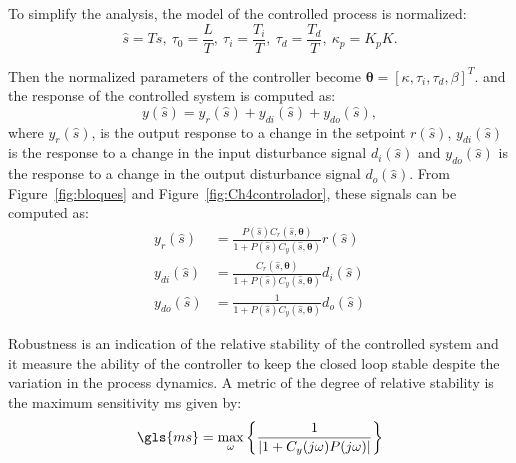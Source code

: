 To simplify the analysis, the model of the controlled process is normalized:
%
\begin{equation*}
\hat{s}= Ts, \ \tau_0=  \displaystyle\frac{L}{T}, \ \tau_i=  \displaystyle\frac{T_i}{T}, \ \tau_d = \frac{T_d}{T}, \ \kappa_p= K_p K.
\end{equation*}  %

Then the normalized parameters of the controller become $\bm{\theta}=\left[\kappa, \tau_i, \tau_d, \beta\right]^T$.
%
and the response of the controlled system is computed as: 
\begin{equation} 
 y(\hat{s})= y_r(\hat{s}) + y_{di}(\hat{s}) + y_{do}(\hat{s}),
\label{ys}
\end{equation}
%
where $y_r(\hat{s})$, is the output response to a change in the setpoint $r(\hat{s})$, $y_{di}(\hat{s})$ is the response to a change in the input disturbance signal $d_i(\hat{s})$ and $y_{do}(\hat{s})$ is the response to a change in the output disturbance signal $d_o(\hat{s})$. From Figure~\ref{fig:bloques} and Figure~\ref{fig:Ch4controlador}, these signals can be computed as:
%
\begin{align*}
 y_r(\hat{s}) &= \frac{P(\hat{s}) C_r(\hat{s},\bm{\theta}) }{1 + P(\hat{s}) C_y(\hat{s},\bm{\theta})} r(\hat{s})\\
y_{di}(\hat{s}) &=  \frac{C_r(\hat{s},\bm{\theta})}{1 + P(\hat{s}) C_y(\hat{s},\bm{\theta})} d_i(\hat{s}) \\%
y_{do}(\hat{s}) &= \frac{1}{1 + P(\hat{s}) C_y(\hat{s},\bm{\theta})} {d_o(\hat{s})}
\label{ytot}
\end{align*}


Robustness is an indication of the relative stability of the controlled system and it measure the ability of the controller to keep the closed loop stable despite the variation in the process dynamics. A metric of the degree of relative stability is the maximum sensitivity \gls{ms} given by:
%
\begin{equation}  %
\gls{ms}=  \max_\omega \left\{ \frac{1}{\left |{1 + C_y(j\omega ) P(j\omega )}\right |}\right\} 
\label{Ms}
\end{equation}

